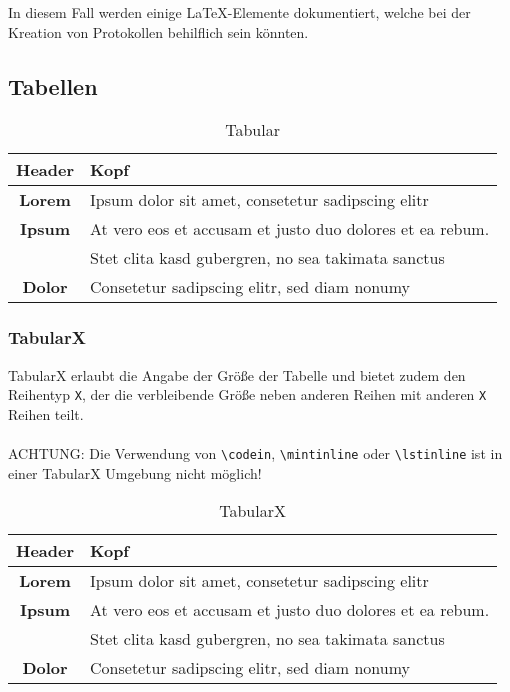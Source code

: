 In diesem Fall werden einige \LaTeX-Elemente dokumentiert, welche bei der Kreation von Protokollen behilflich sein könnten.

\subsection{Tabellen}
\begin{table}[H]
	\center
	\begin{tabular}{| c | l |}
		\hline Header & Kopf\\ \hline\hline
		\textbf{Lorem} & Ipsum dolor sit amet, consetetur sadipscing elitr\\ \hline
		\textbf{Ipsum} & At vero eos et accusam et justo duo dolores et ea rebum.\\
			& Stet clita kasd gubergren, no sea takimata sanctus\\ \hline
		\textbf{Dolor} & Consetetur sadipscing elitr, sed diam nonumy\\\hline
	\end{tabular}
	\caption{Tabular}
	\label{tab:tabular}
\end{table}

\subsubsection{TabularX}
TabularX erlaubt die Angabe der Größe der Tabelle und bietet zudem den Reihentyp \texttt{X}, der die verbleibende Größe neben anderen Reihen mit anderen \texttt{X} Reihen teilt.
\\\\
ACHTUNG: Die Verwendung von \verb|\codein|, \verb|\mintinline| oder \verb|\lstinline| ist in einer TabularX Umgebung nicht möglich!
\begin{table}
    \center
    \begin{tabularx}{\textwidth}{| c | X |}
        \hline Header & Kopf\\ \hline\hline
        \textbf{Lorem} & Ipsum dolor sit amet, consetetur sadipscing elitr\\ \hline
        \textbf{Ipsum} & At vero eos et accusam et justo duo dolores et ea rebum.\\
            & Stet clita kasd gubergren, no sea takimata sanctus\\ \hline
        \textbf{Dolor} & Consetetur sadipscing elitr, sed diam nonumy\\\hline
    \end{tabularx}
    \caption{TabularX}
    \label{tab:tabularx}
\end{table}

